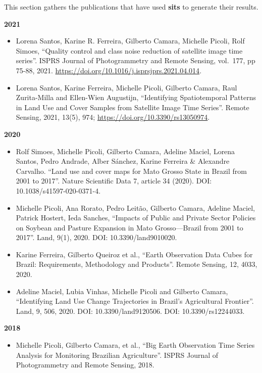 \documentclass[
  11pt,
]{report}
\providecommand{\tightlist}{%
  \setlength{\itemsep}{0pt}\setlength{\parskip}{0pt}}
\begin{document}
This section gathers the publications that have used \textbf{sits} to
generate their results.

\textbf{2021}

\begin{itemize}
\item
  Lorena Santos, Karine R. Ferreira, Gilberto Camara, Michelle Picoli,
  Rolf Simoes, ``Quality control and class noise reduction of satellite
  image time series''. ISPRS Journal of Photogrammetry and Remote
  Sensing, vol.~177, pp 75-88, 2021.
  \url{https://doi.org/10.1016/j.isprsjprs.2021.04.014}.
\item
  Lorena Santos, Karine Ferreira, Michelle Picoli, Gilberto Camara, Raul
  Zurita-Milla and Ellen-Wien Augustijn, ``Identifying Spatiotemporal
  Patterns in Land Use and Cover Samples from Satellite Image Time
  Series''. Remote Sensing, 2021, 13(5), 974;
  \url{https://doi.org/10.3390/rs13050974}.
\end{itemize}

\textbf{2020}

\begin{itemize}
\item
  Rolf Simoes, Michelle Picoli, Gilberto Camara, Adeline Maciel, Lorena
  Santos, Pedro Andrade, Alber Sánchez, Karine Ferreira \& Alexandre
  Carvalho. ``Land use and cover maps for Mato Grosso State in Brazil
  from 2001 to 2017''. Nature Scientific Data 7, article 34 (2020). DOI:
  10.1038/s41597-020-0371-4.
\item
  Michelle Picoli, Ana Rorato, Pedro Leitão, Gilberto Camara, Adeline
  Maciel, Patrick Hostert, Ieda Sanches, ``Impacts of Public and Private
  Sector Policies on Soybean and Pasture Expansion in Mato
  Grosso---Brazil from 2001 to 2017''. Land, 9(1), 2020. DOI:
  10.3390/land9010020.
\item
  Karine Ferreira, Gilberto Queiroz et al., ``Earth Observation Data
  Cubes for Brazil: Requirements, Methodology and Products''. Remote
  Sensing, 12, 4033, 2020.
\item
  Adeline Maciel, Lubia Vinhas, Michelle Picoli and Gilberto Camara,
  ``Identifying Land Use Change Trajectories in Brazil's Agricultural
  Frontier''. Land, 9, 506, 2020. DOI: 10.3390/land9120506. DOI:
  10.3390/rs12244033.
\end{itemize}

\textbf{2018}

\begin{itemize}
\tightlist
\item
  Michelle Picoli, Gilberto Camara, et al., ``Big Earth Observation Time
  Series Analysis for Monitoring Brazilian Agriculture''. ISPRS Journal
  of Photogrammetry and Remote Sensing, 2018.
\end{itemize}
\end{document}
